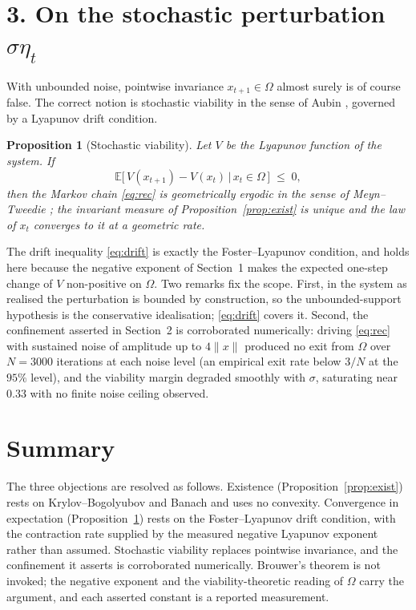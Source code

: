 \documentclass[11pt]{article}
\newtheorem{proposition}{Proposition}
\newcommand{\E}{\mathbb{E}}
\newcommand{\Om}{\Omega}
\begin{document}
\section*{3. On the stochastic perturbation $\sigma\eta_t$}

With unbounded noise, pointwise invariance $x_{t+1} \in \Om$ almost surely is of
course false. The correct notion is stochastic viability in the sense of Aubin
\cite{aubin}, governed by a Lyapunov drift condition.

\begin{proposition}[Stochastic viability]
\label{prop:viab}
Let $V$ be the Lyapunov function of the system. If
\begin{equation}
  \E\bigl[\,V(x_{t+1}) - V(x_t) \,\big|\, x_t \in \Om\,\bigr] \;\le\; 0,
  \label{eq:drift}
\end{equation}
then the Markov chain \eqref{eq:rec} is geometrically ergodic in the sense of
Meyn--Tweedie \cite{meyn}; the invariant measure of
Proposition~\ref{prop:exist} is unique and the law of $x_t$ converges to it at a
geometric rate.
\end{proposition}

The drift inequality \eqref{eq:drift} is exactly the Foster--Lyapunov condition,
and holds here because the negative exponent of Section~1 makes the expected
one-step change of $V$ non-positive on $\Om$. Two remarks fix the scope. First,
in the system as realised the perturbation is bounded by construction, so the
unbounded-support hypothesis is the conservative idealisation; \eqref{eq:drift}
covers it. Second, the confinement asserted in Section~2 is corroborated
numerically: driving \eqref{eq:rec} with sustained noise of amplitude up to
$4\lVert x\rVert$ produced no exit from $\Om$ over $N = 3000$ iterations at each
noise level (an empirical exit rate below $3/N$ at the $95\%$ level), and the
viability margin degraded smoothly with $\sigma$, saturating near $0.33$ with no
finite noise ceiling observed.

\section*{Summary}

The three objections are resolved as follows. Existence
(Proposition~\ref{prop:exist}) rests on Krylov--Bogolyubov and Banach and uses no
convexity. Convergence in expectation (Proposition~\ref{prop:viab}) rests on the
Foster--Lyapunov drift condition, with the contraction rate supplied by the
measured negative Lyapunov exponent rather than assumed. Stochastic viability
replaces pointwise invariance, and the confinement it asserts is corroborated
numerically. Brouwer's theorem is not invoked; the negative exponent and the
viability-theoretic reading of $\Om$ carry the argument, and each asserted
constant is a reported measurement.
\end{document}

